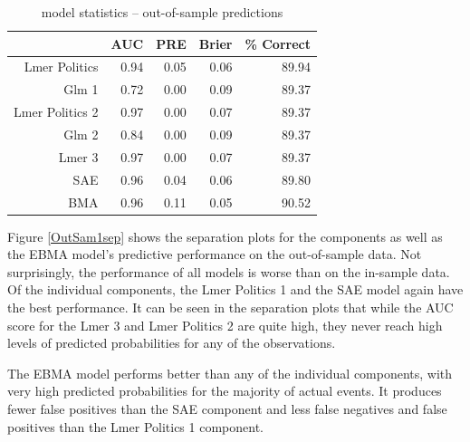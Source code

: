 \documentclass[pdftex,12pt,fullpage,oneside]{amsart}
\begin{document}
\begin{table}[ht]
\begin{center}
\caption{model statistics -- out-of-sample
predictions}\label{OutSam1}
\begin{tabular}{rrrrr}
  \hline
& AUC & PRE & Brier & \% Correct \\ 
  \hline
Lmer Politics & 0.94 & 0.05 & 0.06 & 89.94 \\ 
  Glm 1& 0.72 & 0.00 & 0.09 & 89.37 \\ 
  Lmer Politics 2  & 0.97 & 0.00 & 0.07 & 89.37 \\ 
  Glm 2 & 0.84 & 0.00 & 0.09 & 89.37 \\ 
  Lmer 3 & 0.97 & 0.00 & 0.07 & 89.37 \\ 
  SAE & 0.96 & 0.04 & 0.06 & 89.80 \\ 
  BMA & 0.96 & 0.11 & 0.05 & 90.52 \\ 
   \hline
\end{tabular}
\end{center}
\end{table}

Figure \ref{OutSam1sep} shows the separation plots for the components
as well as the EBMA model's predictive performance on the
out-of-sample data.  Not surprisingly, the performance of all models is
worse than on the in-sample data. Of the individual components, the Lmer
Politics 1 and the SAE model again have the best performance. It can be seen in the separation plots that while
the AUC score for the Lmer 3 and Lmer Politics 2 are quite high, they
never reach high levels of predicted probabilities for any of the
observations.

The EBMA model performs better than any of the individual components, with
very high predicted probabilities for the majority of actual
events. It produces fewer false positives than the SAE component and less
false negatives and false positives than the Lmer Politics 1 component.
\end{document}
